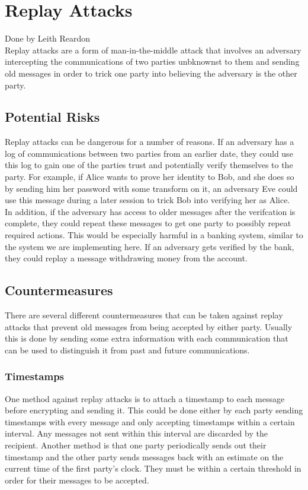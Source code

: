 
\section{Replay Attacks}\label{sec:replayattacks}
Done by Leith Reardon\\

	\medskip
	Replay attacks are a form of man-in-the-middle attack that involves an adversary intercepting the communications of two parties unbknownst to them and sending old messages in order to trick one party into believing the adversary is the other party. 
	
	\subsection{Potential Risks}\label{sec:replayrisks}
		Replay attacks can be dangerous for a number of reasons. If an adversary has a log of communications between two parties from an earlier date, they could use this log to gain one of the parties trust and potentially verify themselves to the party. For example, if Alice wants to prove her identity to Bob, and she does so by sending him her password with some transform on it, an adversary Eve could use this message during a later session to trick Bob into verifying her as Alice. \\

		In addition, if the adversary has access to older messages after the verifcation is complete, they could repeat these messages to get one party to possibly repeat required actions. This would be especially harmful in a banking system, similar to the system we are implementing here. If an adversary gets verified by the bank, they could replay a message withdrawing money from the account. 
	
	\subsection{Countermeasures}\label{sec:replaycountermeasures}
		There are several different countermeasures that can be taken against replay attacks that prevent old messages from being accepted by either party. Usually this is done by sending some extra information with each communication that can be used to distinguish it from past and future communications. 
		
		\subsubsection{Timestamps}\label{sec:replaytimestamps}
			One method against replay attacks is to attach a timestamp to each message before encrypting and sending it. This could be done either by each party sending timestamps with every message and only accepting timestamps within a certain interval. Any messages not sent within this interval are discarded by the recipient. Another method is that one party periodically sends out their timestamp and the other party sends messages back with an estimate on the current time of the first party's clock. They must be within a certain threshold in order for their messages to be accepted.\\

